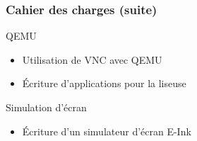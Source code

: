 \begin{frame}

\frametitle{Cahier des charges (suite)}


\begin{block}{QEMU}
\begin{itemize}
\item Utilisation de VNC avec QEMU
\item Écriture d'applications pour la liseuse
\end{itemize}
\end{block}


\begin{block}{Simulation d'écran}
\begin{itemize}
\item Écriture d'un simulateur d'écran E-Ink
\end{itemize}
\end{block}


\end{frame}
